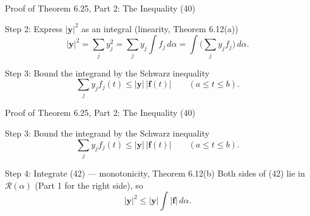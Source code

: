 \documentclass[aspectratio=169,12pt,t]{beamer}
\begin{document}
{%
\begin{frame}{Proof of Theorem 6.25, Part 2: The Inequality (40)}
  \begin{proofblock}{Step 2: Express $|\mathbf{y}|^2$ as an integral (linearity, Theorem 6.12(a))}
    \[
      |\mathbf{y}|^2 = \sum_j y_j^2
      = \sum_j y_j \int f_j\,d\alpha
      = \int \Big(\sum_j y_j f_j\Big)\,d\alpha .
    \]
  \end{proofblock}

  \begin{proofblock}{Step 3: Bound the integrand by the Schwarz inequality}
    \begin{equation}
      \sum_j y_j f_j(t) \leq |\mathbf{y}|\,|\mathbf{f}(t)| \qquad (a \leq t \leq b). \tag{42}
    \end{equation}
  \end{proofblock}

\end{frame}

\begin{frame}{Proof of Theorem 6.25, Part 2: The Inequality (40)}
  \begin{proofblock}{Step 3: Bound the integrand by the Schwarz inequality}
    \begin{equation}
      \sum_j y_j f_j(t) \leq |\mathbf{y}|\,|\mathbf{f}(t)| \qquad (a \leq t \leq b). \tag{42}
    \end{equation}
  \end{proofblock}

  \begin{proofblock}{Step 4: Integrate (42) --- monotonicity, Theorem 6.12(b)}
    Both sides of (42) lie in $\mathscr{R}(\alpha)$ (Part 1 for the right side), so
    \begin{equation}
      |\mathbf{y}|^2 \leq |\mathbf{y}| \int |\mathbf{f}|\,d\alpha . \tag{43}
    \end{equation}
  \end{proofblock}


\end{frame}}
\end{document}
